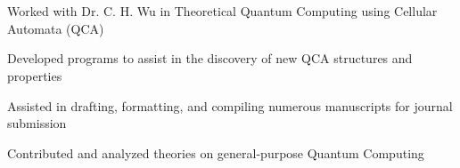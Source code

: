 \documentclass[]{deedy-resume-andrewvanhorn}
\begin{document}
\begin{minipage}[t]{0.66\textwidth}
\section{}
\begin{tightemize}
	\item Worked with Dr. C. H. Wu in Theoretical Quantum Computing using Cellular Automata (QCA)
	\item Developed programs to assist in the discovery of new QCA structures and properties
	\item Assisted in drafting, formatting, and compiling numerous manuscripts for journal submission
	\item Contributed and analyzed theories on general-purpose Quantum Computing
\end{tightemize}
	



\end{minipage} 
\end{document}

